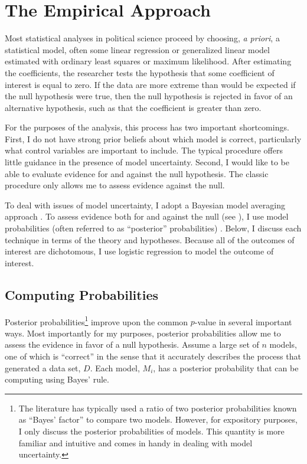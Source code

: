 \documentclass[12pt]{article}
\begin{document}
\section*{The Empirical Approach}

Most statistical analyses in political science proceed by choosing, \textit{a priori}, a statistical model, often some linear regression or generalized linear model estimated with ordinary least squares or maximum likelihood. After estimating the coefficients, the researcher tests the hypothesis that some coefficient of interest is equal to zero. If the data are more extreme than would be expected if the null hypothesis were true, then the null hypothesis is rejected in favor of an alternative hypothesis, such as that the coefficient is greater than zero.

For the purposes of the analysis, this process has two important shortcomings. First, I do not have strong prior beliefs about which model is correct, particularly what control variables are important to include. The typical procedure offers little guidance in the presence of model uncertainty. Second, I would like to be able to evaluate evidence for and against the null hypothesis. The classic procedure only allows me to assess evidence against the null. 

To deal with issues of model uncertainty, I adopt a Bayesian model averaging approach \citep{Raftery1995, MontgomeryNyhan2010}. To assess evidence both for and against the null (see \citealt{Gill1999}), I use model probabilities (often referred to as ``posterior'' probabilities) \citep{Jackman2004, Gill2008, Jackman2009}. Below, I discuss each technique in terms of the theory and hypotheses. Because all of the outcomes of interest are dichotomous, I use logistic regression to model the outcome of interest.

\subsection*{Computing Probabilities}

Posterior probabilities\footnote{The literature has typically used a ratio of two posterior probabilities known as ``Bayes' factor'' to compare two models. However, for expository purposes, I only discuss the posterior probabilities of models. This quantity is more familiar and intuitive and comes in handy in dealing with model uncertainty.} improve upon the common $p$-value in several important ways. Most importantly for my purposes, posterior probabilities allow me to assess the evidence in favor of a null hypothesis. Assume a large set of $n$ models, one of which is ``correct'' in the sense that it accurately describes the process that generated a data set, $D$. Each model, $M_i$, has a posterior probability that can be computing using Bayes' rule.
\end{document}
